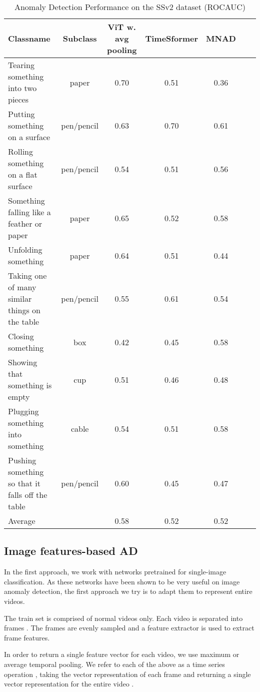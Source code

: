 \documentclass{article}
\begin{document}
\begin{table*}[h]
  \centering
  \label{tab:ss2v_eval}

    \begin{tabular}{lcccccc}
    \toprule      

	Classname	& Subclass	&	ViT w. avg pooling	&	TimeSformer	&	MNAD	\\
\midrule										
	Tearing something into two pieces	&	paper	&	0.70	&	0.51	&	0.36	\\
	Putting something on a surface	&	pen/pencil	&	0.63	&	0.70	&	0.61	\\
	Rolling something on a flat surface	&	pen/pencil	&	0.54	&	0.51	&	0.56	\\
	Something falling like a feather or paper	&	paper	&	0.65	&	0.52	&	0.58	\\
	Unfolding something	&	paper	&	0.64	&	0.51	&	0.44	\\
	Taking one of many similar things on the table	&	pen/pencil	&	0.55	&	0.61	&	0.54	\\
	Closing something	&	box	&	0.42	&	0.45	&	0.58	\\
	Showing that something is empty	&	cup	&	0.51	&	0.46	&	0.48	\\
	Plugging something into something	&	cable	&	0.54	&	0.51	&	0.58	\\
	Pushing something so that it falls off the table	&	pen/pencil	&	0.60	&	0.45	&	0.47	\\
\midrule										
	Average	&		&	0.58	&	0.52	&	0.52	\\
	 \bottomrule
    \end{tabular}
    \caption{Anomaly Detection Performance on the SSv2 dataset (ROCAUC)}
\end{table*}

\subsection{Image features-based AD}

In the first approach, we work with networks pretrained for single-image classification. As these networks have been shown to be very useful on image anomaly detection, the first approach we try is to adapt them to represent entire videos.

The train set  is comprised of normal videos only. Each video is separated into frames . 
The frames are evenly sampled and a feature extractor  is used to extract frame features.



In order to return a single feature vector for each video, we use maximum or average temporal pooling. We refer to each of the above as a time series operation , taking the vector representation of each frame  and returning a single vector representation for the entire video .
\end{document}
